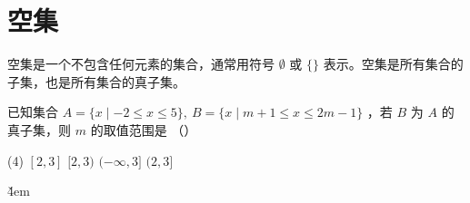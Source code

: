 \section{空集}

\begin{definition}[空集]
    空集是一个不包含任何元素的集合，通常用符号 $\emptyset$ 或 $\{\}$ 表示。空集是所有集合的子集，也是所有集合的真子集。
\end{definition}

\begin{example}
    已知集合 $A=\{x \mid-2 \leq x \leq 5\}, ~ B=\{x \mid m+1 \leq x \leq 2 m-1\}$ ，若 $B$ 为 $A$ 的真子集，则 $m$ 的取值范围是 （\qquad）
    \begin{tasks}(4)
        \task $[2,3]$
        \task $[2,3)$
                        \task $(-\infty, 3]$
        \task $(2,3]$
    \end{tasks}
\end{example}

\v{4em}